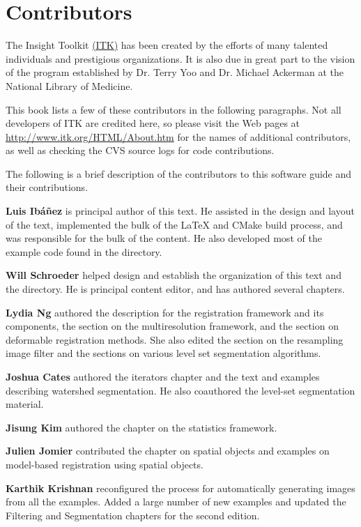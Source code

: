 \chapter*{Contributors}
\noindent

The Insight Toolkit \href{http://www.itk.org}{(ITK)} has been created by the
efforts of many talented individuals and prestigious organizations. It is also
due in great part to the vision of the program established by Dr. Terry Yoo
and Dr. Michael Ackerman at the National Library of Medicine.

This book lists a few of these contributors in the following paragraphs. Not
all developers of ITK are credited here, so please visit the Web pages at
\href{http://www.itk.org/HTML/About.htm}{http://www.itk.org/HTML/About.htm} 
for the names of additional contributors, as well as checking the CVS source
logs for code contributions.

The following is a brief description of the contributors to this software
guide and their contributions.

{\bf Luis Ib\'{a}\~{n}ez} is principal author of this text.
He assisted in the design and layout of the text, implemented the bulk of
the \LaTeX{} and CMake build process, and was responsible for the bulk of 
the content. He also developed most of the example code found in the
 directory.

{\bf Will Schroeder} helped design and establish the organization 
of this text and the  directory. He is principal 
content editor, and has authored several chapters.

{\bf Lydia Ng} authored the description for the registration framework
and its components, the section on the multiresolution framework, and
the section on deformable registration methods. She also edited the
section on the resampling image filter and the sections on various
level set segmentation algorithms.

{\bf Joshua Cates} authored the iterators chapter and the text and examples
describing watershed segmentation. He also coauthored the level-set
segmentation material.

{\bf Jisung Kim} authored the chapter on the statistics framework.

{\bf Julien Jomier} contributed the chapter on spatial objects and examples on
model-based registration using spatial objects.

{\bf Karthik Krishnan} reconfigured the process for automatically generating
images from all the examples. Added a large number of new examples and updated
the Filtering and Segmentation chapters for the second edition.

